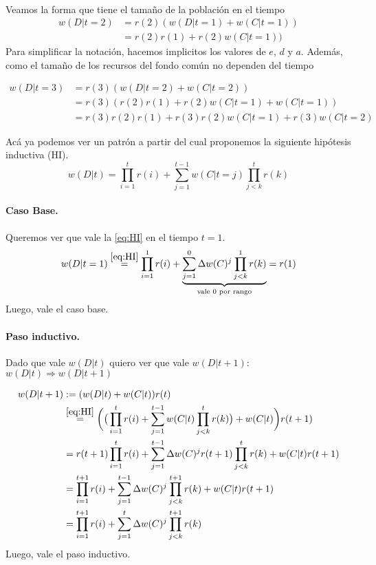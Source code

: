 \documentclass[a4paper,10pt]{article}
\begin{document}
\\

Veamos la forma que tiene el tamaño de la población en el tiempo
\begin{align}
w(D|t=2) & = r(2) (w(D|t=1) + w(C|t=1)) \\
& = r(2)r(1) + r(2)w(C|t=1))
\end{align}
Para simplificar la notación, hacemos implicitos los valores de $e$, $d$ y $a$.
Además, como el tamaño de los recursos del fondo común no dependen del tiempo

\begin{align}
w(D|t=3) & = r(3) (w(D|t=2)+w(C|t=2)) \\
& = r(3) (r(2)r(1) + r(2)w(C|t=1) + w(C|t=1) ) \\
& = r(3)r(2)r(1) + r(3)r(2)w(C|t=1) + r(3)w(C|t=2) 
\end{align}

Acá ya podemos ver un patrón a partir del cual proponemos la siguiente hipótesis inductiva (HI).
\begin{equation} \label{eq:HI} \tag{HI} 
w(D|t) = \prod^t_{i=1} r(i) + \sum^{t-1}_{j=1} w(C|t=j)
\prod^t_{j<k} r(k)
\end{equation}

\paragraph{Caso Base.} Queremos ver que vale la \ref{eq:HI} en el tiempo $t=1$.
\begin{equation} 
w(D|t=1) \overset{\ref{eq:HI}}{=} \prod^1_{i=1} r(i) + \underbrace{\sum^{0}_{j=1} \Delta w(C)^j \prod^1_{j<k} r(k) }_{\text{vale $0$ por rango}} = r(1)
\end{equation}
Luego, vale el caso base.

\paragraph{Paso inductivo.} Dado que vale $w(D|t)$ quiero ver que vale $w(D|t+1)$: $w(D|t) \Rightarrow w(D|t+1)$

\begin{equation}
\begin{split}
w(D|t+1) &:= (w(D|t) + w(C|t)) r(t)  \\
& \overset{\ref{eq:HI}}{=} \bigg( \big(\prod^t_{i=1} r(i) + \sum^{t-1}_{j=1} w(C|t) \prod^t_{j<k} r(k) \big)+ w(C|t) \bigg) r(t+1) \\
& = r(t+1) \prod^t_{i=1} r(i) + \sum^{t-1}_{j=1} \Delta w(C)^j r(t+1) \prod^t_{j<k} r(k) + w(C|t)  r(t+1) \\ 
& = \prod^{t+1}_{i=1} r(i) + \sum^{t-1}_{j=1} \Delta w(C)^j  \prod^{t+1}_{j<k} r(k) + w(C|t)  r(t+1)  \\
& = \prod^{t+1}_{i=1} r(i) + \sum^t_{j=1} \Delta w(C)^j  \prod^{t+1}_{j<k} r(k) 
\end{split}
\end{equation}
Luego, vale el paso inductivo. 
\end{document}
